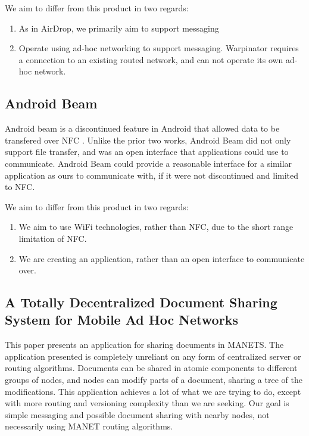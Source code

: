 \documentclass[10pt]{article}
\begin{document}
We aim to differ from this product in two regards:
\begin{enumerate}
    \item As in AirDrop, we primarily aim to support messaging
    \item Operate using ad-hoc networking to support messaging. Warpinator requires a connection to an existing routed network, and can not operate its own ad-hoc network.
\end{enumerate}

\subsection{Android Beam}
Android beam is a discontinued \cite{Cantisano_2022} feature in Android that allowed data to be transfered over NFC \cite{AndroidDevelopers}. Unlike the prior two works, Android Beam did not only support file
transfer, and was an open interface that applications could use to communicate. Android Beam could provide a reasonable interface for a similar application as ours
to communicate with, if it were not discontinued and limited to NFC.

We aim to differ from this product in two regards:
\begin{enumerate}
    \item We aim to use WiFi technologies, rather than NFC, due to the short range limitation of NFC.
    \item We are creating an application, rather than an open interface to communicate over.
\end{enumerate}

\newpage

\subsection{A Totally Decentralized Document Sharing System for Mobile Ad Hoc Networks}
This paper  \cite{10.1145/1164783.1164805} presents an application for sharing documents in MANETS. The application presented
is completely unreliant on any form of centralized server or routing algorithms. Documents can be shared in atomic components to different groups
of nodes, and nodes can modify parts of a document, sharing a tree of the modifications. This application achieves a lot of what we are trying to
do, except with more routing and versioning complexity than we are seeking. Our goal is simple messaging and possible document sharing with nearby
nodes, not necessarily using MANET routing algorithms.
\end{document}
